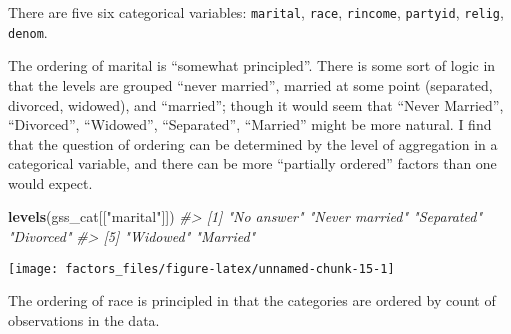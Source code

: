 \documentclass[]{book}
\newenvironment{Shaded}{\begin{snugshade}}{\end{snugshade}}
\newcommand{\CommentTok}[1]{\textcolor[rgb]{0.56,0.35,0.01}{\textit{#1}}}
\newcommand{\DataTypeTok}[1]{\textcolor[rgb]{0.13,0.29,0.53}{#1}}
\newcommand{\KeywordTok}[1]{\textcolor[rgb]{0.13,0.29,0.53}{\textbf{#1}}}
\newcommand{\NormalTok}[1]{#1}
\newcommand{\OperatorTok}[1]{\textcolor[rgb]{0.81,0.36,0.00}{\textbf{#1}}}
\newcommand{\OtherTok}[1]{\textcolor[rgb]{0.56,0.35,0.01}{#1}}
\newcommand{\StringTok}[1]{\textcolor[rgb]{0.31,0.60,0.02}{#1}}
\theoremstyle{plain}
\theoremstyle{remark}
\theoremstyle{definition}
\theoremstyle{definition}
\theoremstyle{definition}
\theoremstyle{remark}
\begin{document}
There are five six categorical variables: \texttt{marital},
\texttt{race}, \texttt{rincome}, \texttt{partyid}, \texttt{relig},
\texttt{denom}.

The ordering of marital is ``somewhat principled''. There is some sort
of logic in that the levels are grouped ``never married'', married at
some point (separated, divorced, widowed), and ``married''; though it
would seem that ``Never Married'', ``Divorced'', ``Widowed'',
``Separated'', ``Married'' might be more natural. I find that the
question of ordering can be determined by the level of aggregation in a
categorical variable, and there can be more ``partially ordered''
factors than one would expect.

\begin{Shaded}
\begin{Highlighting}[]
\KeywordTok{levels}\NormalTok{(gss_cat[[}\StringTok{"marital"}\NormalTok{]])}
\CommentTok{#> [1] "No answer"     "Never married" "Separated"     "Divorced"     }
\CommentTok{#> [5] "Widowed"       "Married"}
\end{Highlighting}
\end{Shaded}

\begin{Shaded}
\end{Shaded}

\begin{center}\texttt{[image: factors\_files/figure-latex/unnamed-chunk-15-1]} \end{center}

The ordering of race is principled in that the categories are ordered by
count of observations in the data.

\begin{Shaded}
\end{Shaded}

\begin{Shaded}
\end{Shaded}
\end{document}
